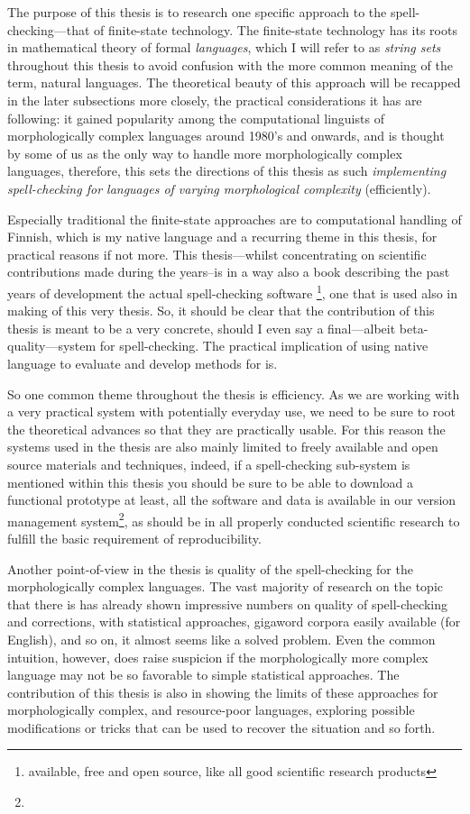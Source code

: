 \documentclass[officiallayout,draft]{unihelcompling}
\begin{document}
The purpose of this thesis is to research one specific approach to the
spell-checking---that of finite-state technology. The finite-state technology
has its roots in mathematical theory of formal \emph{languages}, which I will
refer to as \emph{string sets} throughout this thesis to avoid confusion with
the more common meaning of the term, natural languages. The theoretical beauty
of this approach will be recapped in the later subsections more closely, the
practical considerations it has are following: it gained popularity among the
computational linguists of morphologically complex languages around 1980's and
onwards, and is thought by some of us as the only way to handle more
morphologically complex languages, therefore, this sets the directions of this
thesis as such \emph{implementing spell-checking for languages of varying
morphological complexity} (efficiently). 

Especially traditional the finite-state approaches are to computational
handling of Finnish, which is my native language and a recurring theme in this
thesis, for practical reasons if not more. This thesis---whilst concentrating on
scientific contributions made during the years--is in a way also a book 
describing the past years of development the actual spell-checking software
\footnote{available, free and open source, like all good
scientific research products}, one that is used also in making of this very
thesis. So, it should be clear that the contribution of this thesis is meant
to be a very concrete, should I even say a final---albeit beta-quality---system
for spell-checking. The practical implication of using native language to
evaluate and develop methods for is.

So one common theme throughout the thesis is efficiency. As we are working with
a very practical system with potentially everyday use, we need to be sure to
root the theoretical advances so that they are practically usable. For this
reason the systems used in the thesis are also mainly limited to freely
available and open source materials and techniques, indeed, if a spell-checking
sub-system is mentioned within this thesis you should be sure to be able to
download a functional prototype at least, all the software and data is
available in our version management system\footnote{}, as should be in all
properly conducted scientific research to fulfill the basic requirement of
reproducibility.

Another point-of-view in the thesis is quality of the spell-checking for the
morphologically complex languages. The vast majority of research on the topic
that there is has already shown impressive numbers on quality of spell-checking
and corrections, with statistical approaches, gigaword corpora easily available
(for English), and so on, it almost seems like a solved problem. Even the
common intuition, however, does raise suspicion if the morphologically more
complex language may not be so favorable to simple statistical approaches. The
contribution of this thesis is also in showing the limits of these approaches
for morphologically complex, and resource-poor languages, exploring possible
modifications or tricks that can be used to recover the situation and so forth.
\end{document}
